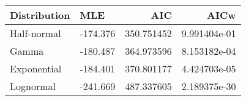 \begin{tabular}{llrr}
\toprule
Distribution &      MLE &         AIC &          AICw \\
\midrule
 Half-normal & -174.376 &  350.751452 &  9.991404e-01 \\
       Gamma & -180.487 &  364.973596 &  8.153182e-04 \\
 Exponential & -184.401 &  370.801177 &  4.424703e-05 \\
   Lognormal & -241.669 &  487.337605 &  2.189375e-30 \\
\bottomrule
\end{tabular}
